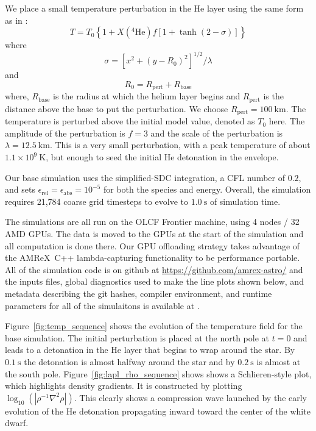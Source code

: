 \documentclass[modern]{aastex631}
\newcommand{\isotm}[2]{{}^{#2}\mathrm{#1}}
\newcommand{\amrex}{{\sf AMReX}}
\newcommand{\MarginPar}[1]{
    \marginpar{\vskip-\baselineskip%
               \raggedright%
               \tiny\sffamily%
               {\color{red}\hrule%
               \smallskip%
               #1\par%
               \smallskip%
               \hrule}}%
}
\begin{document}
We place a small temperature perturbation in the He layer using the
same form as in \citet{castro_simple_sdc}:
\begin{equation}
  T = T_0 \left \{ 1 + X(\isotm{He}{4}) f \left [1 + \tanh(2 - \sigma) \right ] \right \}
\end{equation}
where
\begin{equation}
  \sigma = \left [ x^2 + (y - R_0)^2 \right ]^{1/2} / \lambda
\end{equation}
and
\begin{equation}
  R_0 = R_\mathrm{pert} + R_\mathrm{base}
\end{equation}
where, $R_\mathrm{base}$ is the radius at which the helium layer
begins and $R_\mathrm{pert}$ is the distance above the base to put the
perturbation.  We choose $R_\mathrm{pert} = 100~\mathrm{km}$.  The
temperature is perturbed above the initial model value, denoted as
$T_0$ here.  The amplitude of the perturbation is $f = 3$ and the
scale of the perturbation is $\lambda = 12.5~\mathrm{km}$.  This is a
very small perturbation, with a peak temperature of about $1.1\times
10^9~\mathrm{K}$, but enough to seed the initial He detonation in the
envelope.

Our base simulation uses the simplified-SDC integration, a CFL number
of $0.2$, and sets $\epsilon_\mathrm{rel} = \epsilon_\mathrm{abs} =
10^{-5}$ for both the species and energy.  Overall, the simulation
requires 21,784 coarse grid timesteps to evolve to $1.0~\mathrm{s}$ of
simulation time.

The simulations are all run on the OLCF Frontier machine, using 4
nodes / 32 AMD GPUs.  The data is moved to the GPUs at the start of
the simulation and all computation is done there.  Our GPU offloading
strategy \citep{castro_gpu} takes advantage of the \amrex\ C++
lambda-capturing functionality to be performance portable.
All of the simulation code is on github at
\url{https://github.com/amrex-astro/} and the inputs files, global
diagnostics used to make the line plots shown below, and metadata
describing the git hashes, compiler environment, and runtime
parameters for all of the simulaitons is available at \MarginPar{add
  Zenodo ref}.

\begin{figure*}[t]
\centering
{}
\caption{\label{fig:temp_sequence} Time-sequence of the SDC run showing the temperature.}
\end{figure*}

Figure~\ref{fig:temp_sequence} shows the evolution of the temperature field for the base simulation.  The initial perturbation is placed at the north pole at $t=0$ and leads to a detonation in the He layer that begins to wrap around the star.  By $0.1~\mathrm{s}$ the detonation is almost halfway around the star and by $0.2~\mathrm{s}$ is almost at the south pole.  Figure~\ref{fig:lapl_rho_sequence} shows shows a Schlieren-style plot, which
highlights density gradients.  It is constructed by plotting
$\log_{10}(|\rho^{-1}\nabla^2\rho|)$.  This clearly shows a
compression wave launched by the early evolution of the He detonation propagating inward toward
the center of the white dwarf.  
\end{document}
